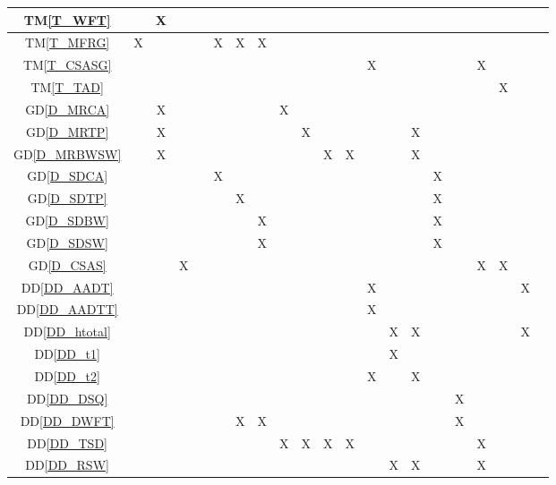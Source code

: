 \documentclass[12pt]{article}
\newcommand{\dref}[1]{GD\ref{#1}}
\newcommand{\ddref}[1]{DD\ref{#1}}
\newcommand{\tref}[1]{TM\ref{#1}}
\begin{document}
\begin{landscape}
\begin{table}[h]
\begin{tabular}{|c|c|c|c|c|c|c|c|c|c|c|c|c|c|c|c|c|c|c|c|c|}
\tref{T_WFT}       &  & X &  & & &  & &  &  &  &  & & &  &  & &&  & &  \\ \hline
\tref{T_MFRG}     &  X &  &  & & X & X  & X &  &  &  &  & & &  &  & &&  & & \\ \hline
\tref{T_CSASG}     &  &  &  & & &  & &  &  &  &  & X & &  &  & &X&  & &\\ \hline
\tref{T_TAD}       &  & &  & & &  & &  &  &  &  & & &  &  & &&X  & &\\ \hline
\dref{D_MRCA}         &  & X &  & & &  & &  X &  &  &  & & &  &  & &&  & & \\ \hline
\dref{D_MRTP}         &  &  X &  & & &  & &  &X  &  &  & & & X &  & &&  & &  \\ \hline
\dref{D_MRBWSW}        &  & X &  & & &  & &  &  & X  & X & & & X  &  & &&  & & \\ \hline
\dref{D_SDCA}         &  &  &  & & X &  & &  &  &  &  & & &  & X  & &&  & & \\ \hline
\dref{D_SDTP}          &  &  &  & & & X & &  &  &  &  & & &  &  X & &&  & &  \\ \hline
\dref{D_SDBW}          &  &  &  & & &  & X &  &  &  &  & & &  & X & &&  & &\\ \hline
\dref{D_SDSW}           &  &  &  & & &  & X &  &  &  &  & & &  & X & &&  & &  \\ \hline
\dref{D_CSAS}       &  &  & X & & &  & &  &  &  &  &  & &  &  & &X& X & &\\ \hline
\ddref{DD_AADT}    &  &  &  & & &  & &  &  &  &  & X & &  &  & &&  & X & \\ \hline
\ddref{DD_AADTT}    &  &  &  & & &  & &  &  &  &  & X& &  &  & &&  & & \\ \hline
\ddref{DD_htotal}   &  &  &  & & &  & &  &  &  &  & & X & X &  & &&  & X & \\ \hline
\ddref{DD_t1}        &  &  &  & & &  & &  &  &  &  & & X &  &  & &&  & & \\ \hline
\ddref{DD_t2}        &  &  &  & & &  & &  &  &  &  & X & &  X &  & &&  & & \\ \hline
\ddref{DD_DSQ}     &  &  &  & & &  & &  &  &  &  & & &  &  & X &&  & &  \\ \hline
\ddref{DD_DWFT}     &  &  &  & & & X & X &  &  &  &  & & &  &  & X &&  & & \\ \hline
\ddref{DD_TSD}     &  &  &  & & &  & & X & X & X & X & & &  &  & &X&  & & \\ \hline
\ddref{DD_RSW}      &  &  &  & & &  & &  &  &  &  & & X & X &  & &X&  & & \\ \hline

\end{tabular}
\end{table}
\end{landscape}
\end{document}
